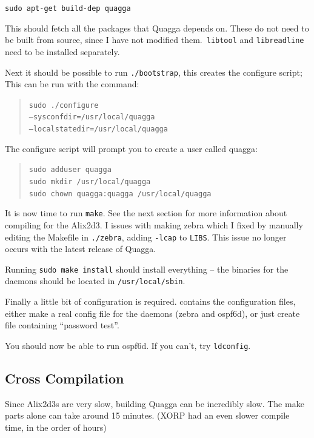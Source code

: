 \texttt{sudo apt-get build-dep quagga}

This should fetch all the packages that Quagga depends on. These do not need to
be built from source, since I have not modified them.\ \texttt{libtool} and
\texttt{libreadline} need to be installed separately. 

Next it should be possible to run \texttt{\@./bootstrap}, this creates the
configure script; This can be run with the command:

\begin{quote}
\texttt{sudo \@./configure \\ --sysconfdir=/usr/local/quagga \\ --localstatedir=/usr/local/quagga}
\end{quote}

The configure script will prompt you to create a user called quagga:

\begin{quote}
\texttt{sudo adduser quagga} \\
\texttt{sudo mkdir /usr/local/quagga} \\
\texttt{sudo chown quagga:quagga /usr/local/quagga} 
\end{quote}

It is now time to run \texttt{make}. See the next section for more information
about compiling for the Alix2d3. I issues with making zebra which I fixed
by manually editing the Makefile in \texttt{\@./zebra}, adding \texttt{-lcap}
to \texttt{LIBS}\@. This issue no longer occurs with the latest release of
Quagga.

Running \texttt{sudo make install} should install everything -- the binaries for the daemons
should be located in \texttt{/usr/local/sbin}.

Finally a little bit of configuration is required. 
contains the configuration files, either make a real config file for the
daemons (zebra and ospf6d), or just create file containing ``password test''.

You should now be able to run ospf6d. If you can't, try \texttt{ldconfig}.

\subsection*{Cross Compilation}
\label{cross_compile}
Since Alix2d3s are very slow, building Quagga can be incredibly slow. The make
parts alone can take around 15 minutes. (XORP had an even slower compile time,
in the order of hours) 

